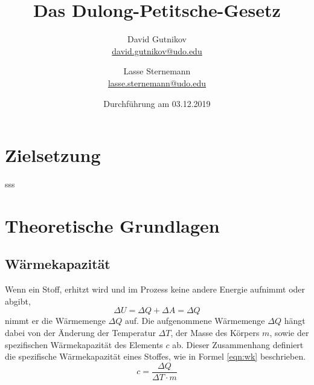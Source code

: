 \documentclass[titlepage = firstcover]{scrartcl}
\title{Das Dulong-Petitsche-Gesetz}
\author{
  David Gutnikov\\
  \href{mailto:david.gutnikov@udo.edu}{david.gutnikov@udo.edu}
 \and 
  Lasse Sternemann\\
  \href{mailto:lasse.sternemann@udo.edu}{lasse.sternemann@udo.edu}
}
\date{Durchführung am 03.12.2019}
\begin{document}
    \maketitle
    \tableofcontents
    \newpage

    \section{Zielsetzung}
        sss


    \section{Theoretische Grundlagen}
        \subsection{Wärmekapazität}
            Wenn ein Stoff, erhitzt wird und im Prozess keine andere Energie aufnimmt oder abgibt,
            \begin{equation*}
                \Delta U = \Delta Q + \Delta A = \Delta Q
            \end{equation*}
            nimmt er die Wärmemenge $\Delta Q$ auf. 
            Die aufgenommene Wärmemenge $\Delta Q$ hängt dabei von der Änderung der Temperatur $\Delta T$,
            der Masse des Körpers $m$, sowie der spezifischen Wärmekapazität des Elements $c$ ab. Dieser Zusammenhang definiert die spezifische
            Wärmekapazität eines Stoffes, wie in Formel \eqref{eqn:wk} beschrieben.  
            \begin{equation}
                c = \frac{\Delta Q}{\Delta T \cdot m }
                \label{eqn:wk}
            \end{equation}
        
\end{document}
